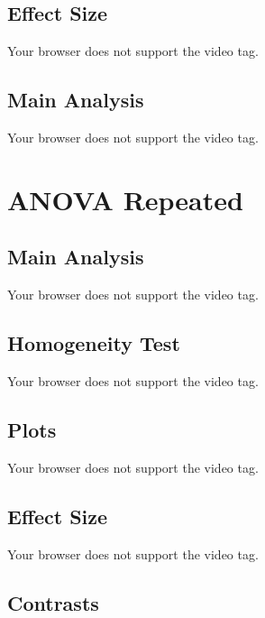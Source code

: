 \documentclass[
  letterpaper,
  DIV=11,
  numbers=noendperiod]{scrreprt}
\begin{document}
\hypertarget{effect-size-2}{%
\subsection{Effect Size}\label{effect-size-2}}

Your browser does not support the video tag.

\hypertarget{main-analysis-3}{%
\subsection{Main Analysis}\label{main-analysis-3}}

Your browser does not support the video tag.

\hypertarget{anova-repeated}{%
\section{ANOVA Repeated}\label{anova-repeated}}

\hypertarget{main-analysis-4}{%
\subsection{Main Analysis}\label{main-analysis-4}}

Your browser does not support the video tag.

\hypertarget{homogeneity-test}{%
\subsection{Homogeneity Test}\label{homogeneity-test}}

Your browser does not support the video tag.

\hypertarget{plots-2}{%
\subsection{Plots}\label{plots-2}}

Your browser does not support the video tag.

\hypertarget{effect-size-3}{%
\subsection{Effect Size}\label{effect-size-3}}

Your browser does not support the video tag.

\hypertarget{contrasts-1}{%
\subsection{Contrasts}\label{contrasts-1}}
\end{document}
